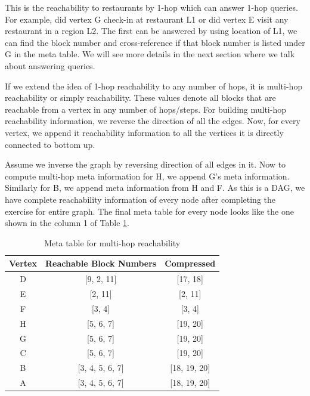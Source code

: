 This is the reachability to restaurants by 1-hop which can answer 1-hop queries. For example, did vertex G check-in at restaurant L1 or did vertex E visit any restaurant in a region L2. The first can be answered by using location of L1, we can find the block number and cross-reference if that block number is listed under G in the meta table. We will see more details in the next section where we talk about answering queries.

If we extend the idea of 1-hop reachability to any number of hops, it is multi-hop reachability or simply reachability. These values denote all blocks that are reachable from a vertex in any number of hops/steps. For building multi-hop reachability information, we reverse the direction of all the edges. Now, for every vertex, we append it reachability information to all the vertices it is directly connected to bottom up.

Assume we inverse the graph by reversing direction of all edges in it. Now to compute multi-hop meta information for H, we append G's meta information. Similarly for B, we append meta information from H and F. As this is a DAG, we have complete reachability information of every node after completing the exercise for entire graph. The final meta table for every node looks like the one shown in the column 1 of Table \ref{tab:multi-hop-meta}.

\begin{table}[h]
	\caption{Meta table for multi-hop reachability}
	\label{tab:multi-hop-meta}
	\begin{center}
		\renewcommand{\arraystretch}{1.25}
		\begin{tabular}{ c | c | c }
			\hline
			Vertex & Reachable Block Numbers & Compressed\\ \hline
			\hline
			D & [9, 2, 11] & [17, 18] \\
			E & [2, 11] & [2, 11] \\
			F & [3, 4] & [3, 4] \\
			H & [5, 6, 7] & [19, 20] \\
			G & [5, 6, 7] & [19, 20] \\
			C & [5, 6, 7] & [19, 20] \\
			B & [3, 4, 5, 6, 7] & [18, 19, 20] \\
			A & [3, 4, 5, 6, 7] & [18, 19, 20] \\
			\hline
		\end{tabular}
	\end{center}
\end{table}

